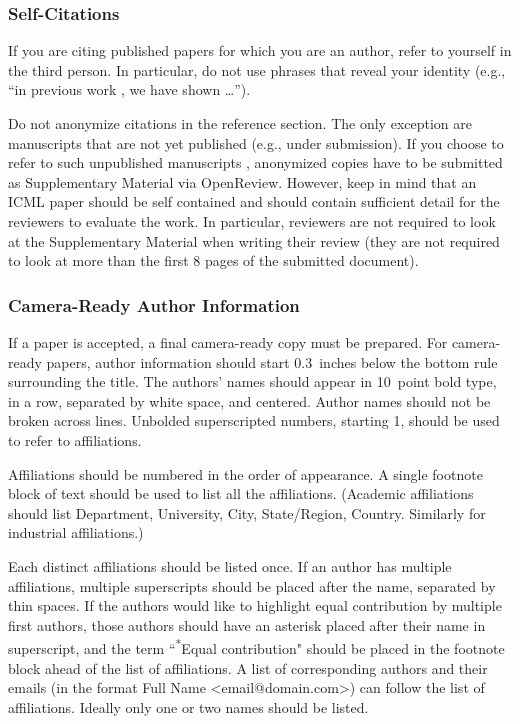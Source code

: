 \documentclass{article}
\theoremstyle{plain}
\theoremstyle{definition}
\theoremstyle{remark}
\begin{document}
\subsubsection{Self-Citations}

If you are citing published papers for which you are an author, refer
to yourself in the third person. In particular, do not use phrases
that reveal your identity (e.g., ``in previous work \cite{langley00}, we
have shown \ldots'').

Do not anonymize citations in the reference section. The only exception are manuscripts that are
not yet published (e.g., under submission). If you choose to refer to
such unpublished manuscripts \cite{anonymous}, anonymized copies have
to be submitted
as Supplementary Material via OpenReview\@. However, keep in mind that an ICML
paper should be self contained and should contain sufficient detail
for the reviewers to evaluate the work. In particular, reviewers are
not required to look at the Supplementary Material when writing their
review (they are not required to look at more than the first $8$ pages of the submitted document).

\subsubsection{Camera-Ready Author Information}
\label{final author}

If a paper is accepted, a final camera-ready copy must be prepared.
%
For camera-ready papers, author information should start 0.3~inches below the
bottom rule surrounding the title. The authors' names should appear in 10~point
bold type, in a row, separated by white space, and centered. Author names should
not be broken across lines. Unbolded superscripted numbers, starting 1, should
be used to refer to affiliations.

Affiliations should be numbered in the order of appearance. A single footnote
block of text should be used to list all the affiliations. (Academic
affiliations should list Department, University, City, State/Region, Country.
Similarly for industrial affiliations.)

Each distinct affiliations should be listed once. If an author has multiple
affiliations, multiple superscripts should be placed after the name, separated
by thin spaces. If the authors would like to highlight equal contribution by
multiple first authors, those authors should have an asterisk placed after their
name in superscript, and the term ``\textsuperscript{*}Equal contribution"
should be placed in the footnote block ahead of the list of affiliations. A
list of corresponding authors and their emails (in the format Full Name
\textless{}email@domain.com\textgreater{}) can follow the list of affiliations.
Ideally only one or two names should be listed.
\end{document}
